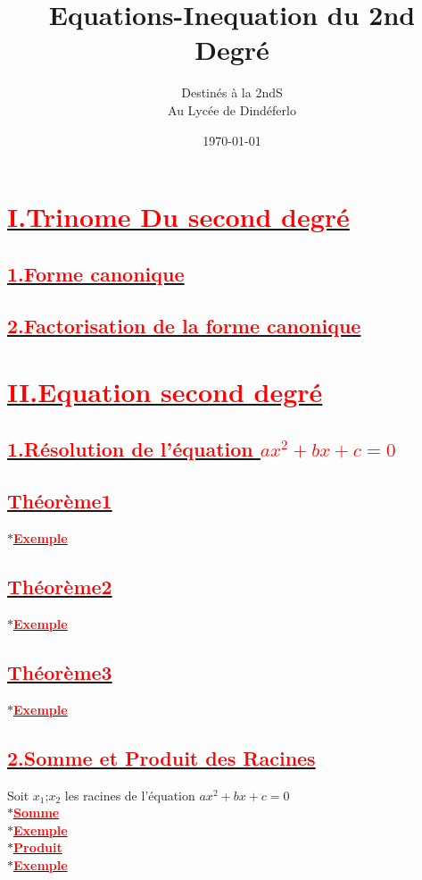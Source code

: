 \documentclass[12pt]{article}
\author{Destinés à la 2ndS\\Au Lycée de Dindéferlo}
\title{\textbf{Equations-Inequation du 2nd Degré}}
\date{\today}
\begin{document}
\maketitle
\newpage
\section*{\underline{\textbf{\textcolor{red}{I.Trinome Du second degré}}}}
\subsection*{\underline{\textbf{\textcolor{red}{1.Forme canonique}}}}
\subsection*{\underline{\textbf{\textcolor{red}{2.Factorisation de la forme canonique}}}}
\section*{\underline{\textbf{\textcolor{red}{II.Equation second degré}}}}
\subsection*{\underline{\textbf{\textcolor{red}{1.Résolution de l'équation $ax^{2}+bx+c=0$}}}}
\subsection*{\underline{\textbf{\textcolor{red}{Théorème1}}}}
$\ast$\underline{\textbf{\textcolor{red}{Exemple}}}\\
\subsection*{\underline{\textbf{\textcolor{red}{Théorème2}}}}
$\ast$\underline{\textbf{\textcolor{red}{Exemple}}}\\
\subsection*{\underline{\textbf{\textcolor{red}{Théorème3}}}}
$\ast$\underline{\textbf{\textcolor{red}{Exemple}}}\\
\subsection*{\underline{\textbf{\textcolor{red}{2.Somme et Produit des Racines}}}}
Soit $x_{1}$;$x_{2}$ les racines de l'équation $ax^{2}+bx+c=0$\\
$\ast$\underline{\textbf{\textcolor{red}{Somme}}}\\
$\ast$\underline{\textbf{\textcolor{red}{Exemple}}}\\
$\ast$\underline{\textbf{\textcolor{red}{Produit}}}\\
$\ast$\underline{\textbf{\textcolor{red}{Exemple}}}\\
\end{document}
